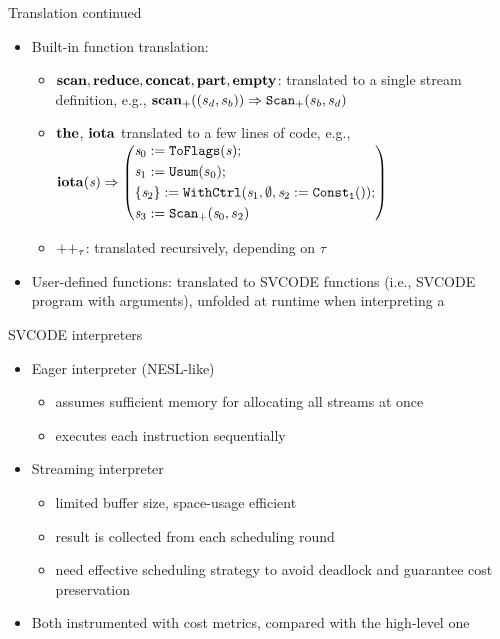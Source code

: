 \documentclass{beamer}
\begin{document}
\begin{frame}{Translation continued}
	\begin{itemize}
		 \item Built-in function translation: 
		\begin{itemize}
			\item $\*{scan}, \*{reduce}, \*{concat}, \*{part}, \*{empty}$: translated to a single stream definition, e.g., 
			${\*{scan}_+}{((s_d,s_b))} \Ra {\genscan_{+}(s_b,s_d)}$
			\item $\*{the}$, $\*{iota}$ translated to a few lines of code, e.g.,
			$\iota{\s} \Ra \left(
			 \begin{aligned}
			 & \sdef{\s_0}{\toflag(\s)} ; \\ 
			 & \sdef{\s_1}{\usum(s_0)} ; \\
			 & \withctrl{\s_1}{\sdef{\s_2}{\consta{1}()}}{\emptyset}{\{\s_2\}}; \\
			 & \sdef{\s_3}{\genscan_{+}(\s_0,s_2)}
			 \end{aligned} 
			 \right)$
			 
			\item $\*{++}_{\tau}$: translated recursively, depending on $\tau$

		\end{itemize}
		\item User-defined functions: translated to SVCODE functions (i.e., SVCODE program with arguments), unfolded at runtime when interpreting a \sc 
	\end{itemize}
\end{frame}

\begin{frame}{SVCODE interpreters}
\begin{itemize}
	\item Eager interpreter (NESL-like) 
	\begin{itemize}
		\item assumes sufficient memory for allocating all streams at once
		\item executes each instruction sequentially 
	\end{itemize}
	\item Streaming interpreter
	\begin{itemize}
		\item limited buffer size, space-usage efficient
		\item result is collected from  each scheduling round
		\item need effective scheduling strategy to avoid deadlock and guarantee cost preservation
	\end{itemize} 
	
	\item Both instrumented with cost metrics, compared with the high-level one 
\end{itemize}
\end{frame}
\end{document}
